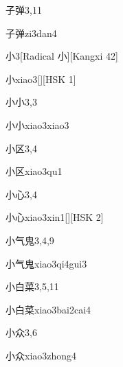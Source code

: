 \begin{entry}{子弹}{3,11}
  \begin{phonetics}{子弹}{zi3dan4}
  \end{phonetics}
\end{entry}

\begin{entry}{小}{3}[Radical 小][Kangxi 42]
  \begin{phonetics}{小}{xiao3}[][HSK 1]
  \end{phonetics}
\end{entry}

\begin{entry}{小小}{3,3}
  \begin{phonetics}{小小}{xiao3xiao3}
  \end{phonetics}
\end{entry}

\begin{entry}{小区}{3,4}
  \begin{phonetics}{小区}{xiao3qu1}
  \end{phonetics}
\end{entry}

\begin{entry}{小心}{3,4}
  \begin{phonetics}{小心}{xiao3xin1}[][HSK 2]
  \end{phonetics}
\end{entry}

\begin{entry}{小气鬼}{3,4,9}
  \begin{phonetics}{小气鬼}{xiao3qi4gui3}
  \end{phonetics}
\end{entry}

\begin{entry}{小白菜}{3,5,11}
  \begin{phonetics}{小白菜}{xiao3bai2cai4}
  \end{phonetics}
\end{entry}

\begin{entry}{小众}{3,6}
  \begin{phonetics}{小众}{xiao3zhong4}
  \end{phonetics}
\end{entry}

